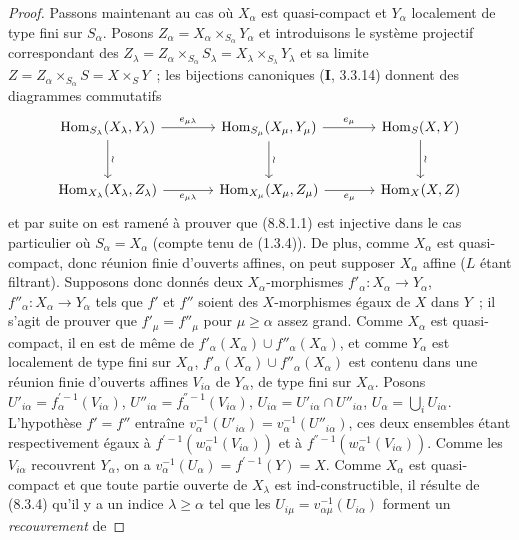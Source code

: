 \begin{proof}
Passons maintenant au cas où $X_\alpha$ est quasi-compact et $Y_\alpha$
localement de type fini sur $S_\alpha$. Posons
$Z_\alpha=X_\alpha\times_{S_\alpha}Y_\alpha$ et introduisons le système
projectif correspondant des
$Z_\lambda=Z_\alpha\times_{S_\alpha}S_\lambda=
X_\lambda\times_{S_\lambda}Y_\lambda$ et sa limite
$Z=Z_\alpha\times_{S_\alpha}S=X\times_S Y$~; les bijections canoniques
(\textbf{I}, 3.3.14) donnent des diagrammes commutatifs
\[
\begin{tikzcd}[column sep=large,row sep=large]
\operatorname{Hom}_{S_\lambda}(X_\lambda,Y_\lambda)
  \ar[r,"e_{\mu\lambda}"] \ar[d,"\wr"] &
\operatorname{Hom}_{S_\mu}(X_\mu,Y_\mu)
  \ar[r,"e_\mu"] \ar[d,"\wr"] &
\operatorname{Hom}_S(X,Y) \ar[d,"\wr"] \\
\operatorname{Hom}_{X_\lambda}(X_\lambda,Z_\lambda)
  \ar[r,"e_{\mu\lambda}"'] &
\operatorname{Hom}_{X_\mu}(X_\mu,Z_\mu)
  \ar[r,"e_\mu"'] &
\operatorname{Hom}_X(X,Z)
\end{tikzcd}
\]
et par suite on est ramené à prouver que (8.8.1.1) est injective dans le cas
particulier où $S_\alpha=X_\alpha$ (compte tenu de (1.3.4)). De plus, comme
$X_\alpha$ est quasi-compact, donc réunion finie d'ouverts affines, on peut
supposer $X_\alpha$ affine ($L$ étant filtrant). Supposons donc donnés deux
$X_\alpha$-morphismes $f'_\alpha:X_\alpha\to Y_\alpha$,
$f''_\alpha:X_\alpha\to Y_\alpha$ tels que $f'$ et $f''$ soient des
$X$-morphismes égaux de $X$ dans $Y$~; il s'agit de prouver que
$f'_\mu=f''_\mu$ pour $\mu\geq\alpha$ assez grand. Comme $X_\alpha$ est
quasi-compact, il en est de même de
$f'_\alpha(X_\alpha)\cup f''_\alpha(X_\alpha)$, et comme $Y_\alpha$ est
localement de type fini sur $X_\alpha$,
$f'_\alpha(X_\alpha)\cup f''_\alpha(X_\alpha)$ est contenu dans une réunion
finie d'ouverts affines $V_{i\alpha}$ de $Y_\alpha$, de type fini sur
$X_\alpha$. Posons
$U'_{i\alpha}=f_\alpha^{'-1}(V_{i\alpha})$,
$U''_{i\alpha}=f_\alpha^{''-1}(V_{i\alpha})$,
$U_{i\alpha}=U'_{i\alpha}\cap U''_{i\alpha}$,
$U_\alpha=\bigcup_iU_{i\alpha}$. L'hypothèse $f'=f''$ entraîne
$v_\alpha^{-1}(U'_{i\alpha})=v_\alpha^{-1}(U''_{i\alpha})$, ces deux ensembles
étant respectivement égaux à $f^{'-1}(w_\alpha^{-1}(V_{i\alpha}))$ et à
$f^{''-1}(w_\alpha^{-1}(V_{i\alpha}))$. Comme les $V_{i\alpha}$ recouvrent
$Y_\alpha$, on a $v_\alpha^{-1}(U_\alpha)=f^{'-1}(Y)=X$. Comme $X_\alpha$
est quasi-compact et que toute partie ouverte de $X_\lambda$ est
ind-constructible, il résulte de (8.3.4) qu'il y a un indice
$\lambda\geq\alpha$ tel que les
$U_{i\mu}=v_{\alpha\mu}^{-1}(U_{i\alpha})$ forment un \emph{recouvrement} de

\end{proof}
